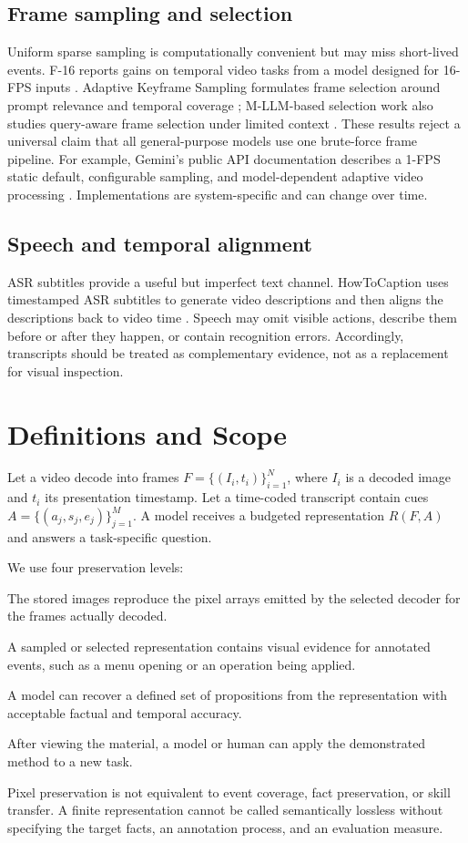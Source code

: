 \documentclass[11pt]{article}
\begin{document}
\subsection{Frame sampling and selection}
Uniform sparse sampling is computationally convenient but may miss short-lived events. F-16 reports gains on temporal video tasks from a model designed for 16-FPS inputs \cite{f16}. Adaptive Keyframe Sampling formulates frame selection around prompt relevance and temporal coverage \cite{aks}; M-LLM-based selection work also studies query-aware frame selection under limited context \cite{mllmselect}. These results reject a universal claim that all general-purpose models use one brute-force frame pipeline. For example, Gemini's public API documentation describes a 1-FPS static default, configurable sampling, and model-dependent adaptive video processing \cite{geminidocs}. Implementations are system-specific and can change over time.

\subsection{Speech and temporal alignment}
ASR subtitles provide a useful but imperfect text channel. HowToCaption uses timestamped ASR subtitles to generate video descriptions and then aligns the descriptions back to video time \cite{howtocaption}. Speech may omit visible actions, describe them before or after they happen, or contain recognition errors. Accordingly, transcripts should be treated as complementary evidence, not as a replacement for visual inspection.

\section{Definitions and Scope}
Let a video decode into frames $F=\{(I_i,t_i)\}_{i=1}^{N}$, where $I_i$ is a decoded image and $t_i$ its presentation timestamp. Let a time-coded transcript contain cues $A=\{(a_j,s_j,e_j)\}_{j=1}^{M}$. A model receives a budgeted representation $R(F,A)$ and answers a task-specific question.

We use four preservation levels:
\begin{description}[leftmargin=1.5em,style=nextline]
  \item[Pixel preservation] The stored images reproduce the pixel arrays emitted by the selected decoder for the frames actually decoded.
  \item[Event coverage] A sampled or selected representation contains visual evidence for annotated events, such as a menu opening or an operation being applied.
  \item[Fact preservation] A model can recover a defined set of propositions from the representation with acceptable factual and temporal accuracy.
  \item[Skill transfer] After viewing the material, a model or human can apply the demonstrated method to a new task.
\end{description}
Pixel preservation is not equivalent to event coverage, fact preservation, or skill transfer. A finite representation cannot be called semantically lossless without specifying the target facts, an annotation process, and an evaluation measure.
\end{document}
